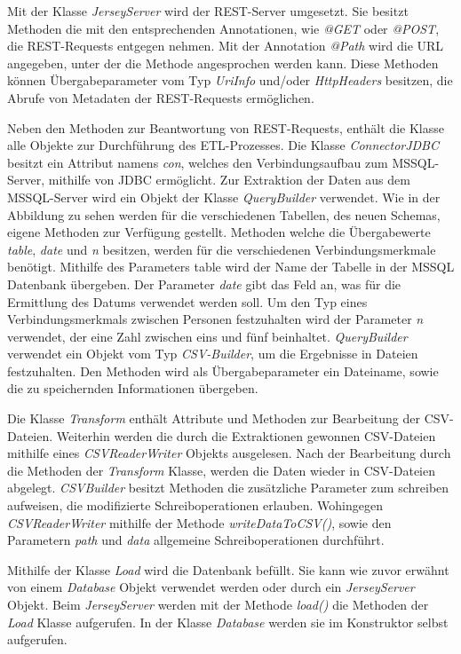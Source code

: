 Mit der Klasse \textit{JerseyServer} wird der REST-Server umgesetzt. Sie besitzt Methoden die mit den entsprechenden Annotationen, wie \textit{@GET} oder \textit{@POST}, die REST-Requests entgegen nehmen. Mit der Annotation \textit{@Path} wird die URL angegeben, unter der die Methode angesprochen werden kann. Diese Methoden können Übergabeparameter vom Typ \textit{UriInfo} und/oder \textit{HttpHeaders} besitzen, die Abrufe von Metadaten der REST-Requests ermöglichen. 

Neben den Methoden zur Beantwortung von REST-Requests, enthält die Klasse alle Objekte zur Durchführung des ETL-Prozesses. Die Klasse \textit{ConnectorJDBC} besitzt ein Attribut namens \textit{con}, welches den Verbindungsaufbau zum MSSQL-Server, mithilfe von JDBC ermöglicht. Zur Extraktion der Daten aus dem MSSQL-Server wird ein Objekt der Klasse \textit{QueryBuilder} verwendet. Wie in der Abbildung zu sehen werden für die verschiedenen Tabellen, des neuen Schemas, eigene Methoden zur Verfügung gestellt. Methoden welche die Übergabewerte \textit{table}, \textit{date} und \textit{n} besitzen, werden für die verschiedenen Verbindungsmerkmale benötigt. Mithilfe des Parameters table wird der Name der Tabelle in der MSSQL Datenbank übergeben. Der Parameter \textit{date} gibt das Feld an, was für die Ermittlung des Datums verwendet werden soll. Um den Typ eines Verbindungsmerkmals zwischen Personen festzuhalten wird der Parameter \textit{n} verwendet, der eine Zahl zwischen eins und fünf beinhaltet. \textit{QueryBuilder} verwendet ein Objekt vom Typ \textit{CSV-Builder}, um die Ergebnisse in Dateien festzuhalten. Den Methoden wird als Übergabeparameter ein Dateiname, sowie die zu speichernden Informationen übergeben.

Die Klasse \textit{Transform} enthält Attribute und Methoden zur Bearbeitung der CSV-Dateien. Weiterhin werden die durch die Extraktionen gewonnen CSV-Dateien mithilfe eines \textit{CSVReaderWriter} Objekts ausgelesen. Nach der Bearbeitung durch die Methoden der \textit{Transform} Klasse, werden die Daten wieder in CSV-Dateien abgelegt. \textit{CSVBuilder} besitzt Methoden die zusätzliche Parameter zum schreiben aufweisen, die modifizierte Schreiboperationen erlauben. Wohingegen \textit{CSVReaderWriter} mithilfe der Methode \textit{writeDataToCSV()}, sowie den Parametern \textit{path} und \textit{data} allgemeine Schreiboperationen durchführt.

Mithilfe der Klasse \textit{Load} wird die Datenbank befüllt. Sie kann wie zuvor erwähnt von einem \textit{Database} Objekt verwendet werden oder durch ein \textit{JerseyServer} Objekt. Beim \textit{JerseyServer} werden mit der Methode \textit{load()} die Methoden der \textit{Load} Klasse aufgerufen. In der Klasse \textit{Database} werden sie im Konstruktor selbst aufgerufen. 

